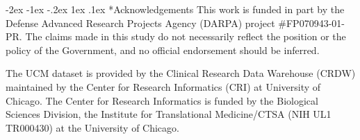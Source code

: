 \documentclass[onecolumn,,10pt]{IEEEtran}
\makeatletter
\renewcommand\section{\@startsection {section}{1}{\z@}%
  {-2ex \@plus -1ex \@minus -.2ex}%
  {1ex \@plus.1ex}%
  {\Large\bfseries\scshape}}
\makeatother
\begin{document}
\section*{Acknowledgements}
This work is funded in part by the Defense Advanced Research Projects Agency (DARPA) project \#FP070943-01-PR. The claims made in this study  do not necessarily reflect the position or the
policy of the Government, and no official endorsement should be inferred.

The UCM dataset is provided by the Clinical Research Data Warehouse (CRDW) maintained by the Center for Research Informatics (CRI) at University of Chicago. The Center for Research Informatics is funded by the Biological Sciences Division, the Institute for Translational Medicine/CTSA (NIH UL1 TR000430) at the University of Chicago. 
   

 

\end{document}
